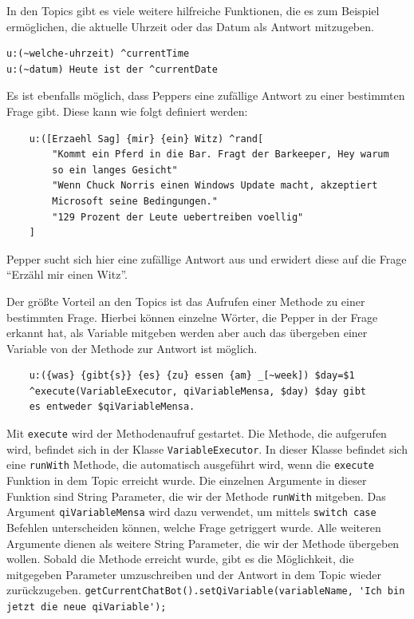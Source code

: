 In den Topics gibt es viele weitere hilfreiche Funktionen, die es zum Beispiel ermöglichen, die aktuelle Uhrzeit oder das Datum als Antwort 
mitzugeben. \\

\begin{lstlisting}
u:(~welche-uhrzeit) ^currentTime
u:(~datum) Heute ist der ^currentDate
\end{lstlisting}

Es ist ebenfalls möglich, dass Peppers eine zufällige Antwort zu einer bestimmten Frage gibt. Diese kann wie folgt definiert werden:\\

\begin{lstlisting}
    u:([Erzaehl Sag] {mir} {ein} Witz) ^rand[
        "Kommt ein Pferd in die Bar. Fragt der Barkeeper, Hey warum 
        so ein langes Gesicht"
        "Wenn Chuck Norris einen Windows Update macht, akzeptiert 
        Microsoft seine Bedingungen."
        "129 Prozent der Leute uebertreiben voellig"
    ]
\end{lstlisting}

Pepper sucht sich hier eine zufällige Antwort aus und erwidert diese auf die Frage ``Erzähl mir einen Witz''. 

Der größte Vorteil an den Topics ist das Aufrufen einer Methode zu einer bestimmten Frage. 
Hierbei können einzelne Wörter, die Pepper in der Frage erkannt hat, als Variable mitgeben werden aber auch das übergeben einer Variable von 
der Methode zur Antwort ist möglich.\\

\begin{lstlisting}
    u:({was} {gibt{s}} {es} {zu} essen {am} _[~week]) $day=$1 
    ^execute(VariableExecutor, qiVariableMensa, $day) $day gibt 
    es entweder $qiVariableMensa.
\end{lstlisting}

Mit \verb|execute| wird der Methodenaufruf gestartet. Die Methode, die aufgerufen wird, befindet sich in der Klasse \verb|VariableExecutor|. 
In dieser Klasse befindet sich eine \verb|runWith| Methode, die automatisch ausgeführt wird, wenn die \verb|execute| Funktion in dem Topic 
erreicht wurde.
Die einzelnen Argumente in dieser Funktion sind String Parameter, die wir der Methode \verb|runWith| mitgeben. Das Argument 
\verb|qiVariableMensa| wird dazu verwendet, um mittels \verb|switch case| Befehlen unterscheiden können, welche Frage getriggert wurde. 
Alle weiteren Argumente dienen als weitere String Parameter, die wir der Methode übergeben wollen. Sobald die Methode erreicht wurde, gibt es 
die Möglichkeit, die mitgegeben Parameter umzuschreiben und der Antwort in dem Topic wieder zurückzugeben. 
\verb|getCurrentChatBot().setQiVariable(variableName, 'Ich bin jetzt die neue qiVariable');|\\

